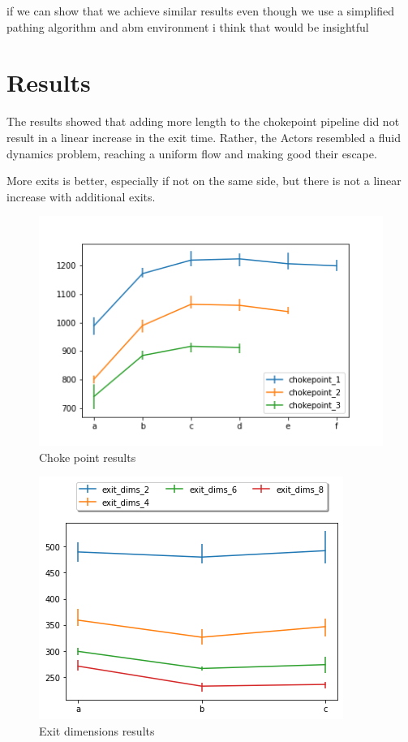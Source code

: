 \documentclass[12pt,letterpaper]{article}
\begin{document}
if we can show that we achieve similar results even though we use a simplified pathing algorithm and abm environment i think that would be insightful



\section{Results}

The results showed that adding more length to the chokepoint pipeline did not
result in a linear increase in the exit time. Rather, the Actors resembled a
fluid dynamics problem, reaching a uniform flow and making good their escape.

More exits is better, especially if not on the same side, but there is not a
linear increase with additional exits.

\begin{figure} 
  \centering
  \includegraphics[width=.9\linewidth]{./figures/chokepoint_graph.png}
  \caption{Choke point results}
  \label{fig:chokepointResults}
\end{figure}
\begin{figure}
  \centering
  \includegraphics[width=.75\linewidth]{./figures/exit_dims_graph.png}
  \caption{Exit dimensions results}
  \label{fig:exitdimsResults}
\end{figure}
\end{document}
